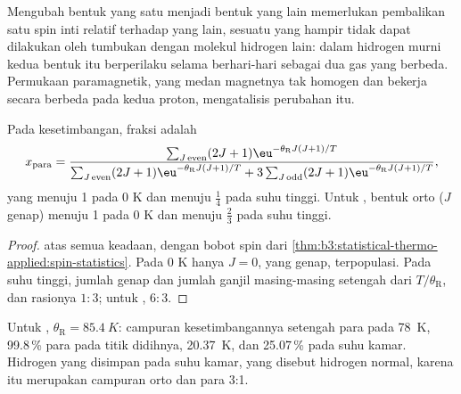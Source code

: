 Mengubah bentuk yang satu menjadi bentuk yang lain memerlukan pembalikan
satu spin inti relatif terhadap yang lain, sesuatu yang hampir tidak dapat
dilakukan oleh tumbukan dengan molekul hidrogen lain: dalam hidrogen murni
kedua bentuk itu berperilaku selama berhari-hari sebagai dua gas yang berbeda.
Permukaan paramagnetik, yang medan magnetnya tak homogen dan bekerja secara
berbeda pada kedua proton, mengatalisis perubahan itu.

\begin{proposition}\label{prop:b3:statistical-thermo-applied:ortho-para}
Pada kesetimbangan, fraksi  adalah
\[
  x_{\mathrm{para}} = \frac{\sum_{J\,\mathrm{even}}(2J+1)\eu^{-\theta_{\mathrm R}J(J+1)/T}}
    {\sum_{J\,\mathrm{even}}(2J+1)\eu^{-\theta_{\mathrm R}J(J+1)/T} + 3\sum_{J\,\mathrm{odd}}(2J+1)\eu^{-\theta_{\mathrm R}J(J+1)/T}},
\]
yang menuju 1 pada 0 K dan menuju $\frac14$ pada suhu tinggi. Untuk ,
bentuk orto ($J$ genap) menuju 1 pada 0 K dan menuju $\frac23$ pada suhu tinggi.
\end{proposition}

\begin{proof}
 atas semua keadaan, dengan bobot spin dari
\cref{thm:b3:statistical-thermo-applied:spin-statistics}. Pada 0 K hanya $J = 0$,
yang genap, terpopulasi. Pada suhu tinggi, jumlah genap dan jumlah ganjil
masing-masing setengah dari $T/\theta_{\mathrm R}$, dan rasionya $1 : 3$; untuk ,
$6 : 3$.
\end{proof}

Untuk , $\theta_{\mathrm R} = \qty{85.4}{K}$: campuran kesetimbangannya setengah
para pada \qty{78}{K}, 99.8\,\% para pada titik didihnya, \qty{20.37}{K}, dan
25.07\,\% pada suhu kamar. Hidrogen yang disimpan pada suhu kamar, yang
disebut hidrogen normal, karena itu merupakan campuran orto dan para 3:1.

